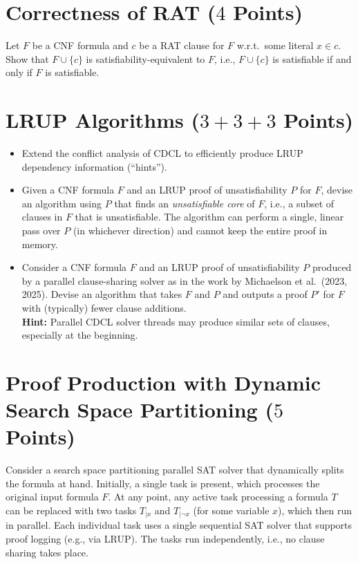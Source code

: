 \documentclass[a4paper]{article}
\begin{document}



\section{Correctness of RAT ($4$ Points)}
Let $F$ be a CNF formula and $c$ be a RAT clause for $F$ w.r.t.~some literal $x \in c$.
\\Show that $F \cup \{c\}$ is satisfiability-equivalent to $F$, i.e., $F \cup \{c\}$ is satisfiable if and only if $F$ is satisfiable.



\section{LRUP Algorithms ($3+3+3$ Points)}
\begin{itemize}
	\item[(a)] Extend the conflict analysis of CDCL to efficiently produce LRUP dependency information (``hints'').
	\item[(b)] Given a CNF formula $F$ and an LRUP proof of unsatisfiability $P$ for $F$, devise an algorithm using $P$ that finds an \emph{unsatisfiable core} of $F$, i.e., a subset of clauses in $F$ that is unsatisfiable.
	The algorithm can perform a single, linear pass over $P$ (in whichever direction) and cannot keep the entire proof in memory.
	\item[(c)] Consider a CNF formula $F$ and an LRUP proof of unsatisfiability $P$ produced by a parallel clause-sharing solver as in the work by Michaelson et al.~(2023, 2025).
	Devise an algorithm that takes $F$ and $P$ and outputs a proof $P'$ for $F$ with (typically) fewer clause additions.
	\\\textbf{Hint:} Parallel CDCL solver threads may produce similar sets of clauses, especially at the beginning.
\end{itemize}



\section{Proof Production with Dynamic Search Space Partitioning ($5$ Points)}
Consider a search space partitioning parallel SAT solver that dynamically splits the formula at hand.
Initially, a single task is present, which processes the original input formula $F$.
At any point, any active task processing a formula $T$ can be replaced with two tasks $T_{|x}$ and $T_{|\neg x}$ (for some variable $x$), which then run in parallel.
Each individual task uses a single sequential SAT solver that supports proof logging (e.g., via LRUP).
The tasks run independently, i.e., no clause sharing takes place.
\end{document}
